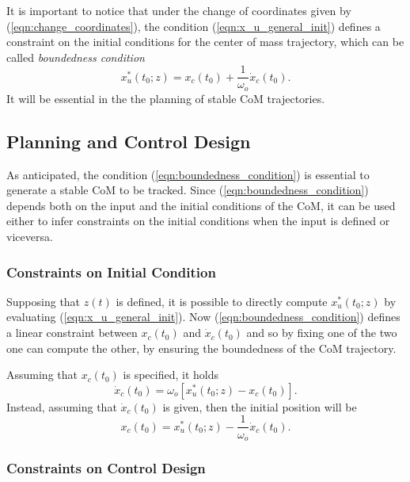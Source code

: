 \documentclass[11pt]{article}
\begin{document}
It is important to notice that under the change of coordinates given by (\ref{eqn:change_coordinates}), the condition (\ref{eqn:x_u_general_init}) defines a constraint on the initial conditions for the center of mass trajectory, which can be called \textit{boundedness condition}
\begin{equation}
\label{eqn:boundedness_condition}
x_u^*(t_0;z) = x_c(t_0) + \frac{1}{\omega_o}\dot{x}_c(t_0).
\end{equation}
It will be essential in the the planning of stable CoM trajectories.

\subsection{Planning and Control Design}

As anticipated, the condition (\ref{eqn:boundedness_condition}) is essential to generate a stable CoM to be tracked. Since (\ref{eqn:boundedness_condition}) depends both on the input and the initial conditions of the CoM, it can be used either to infer constraints on the initial conditions when the input is defined or viceversa.

\subsubsection{Constraints on Initial Condition}

Supposing that $z(t)$ is defined, it is possible to directly compute $x_u^*(t_0;z)$ by evaluating (\ref{eqn:x_u_general_init}). Now (\ref{eqn:boundedness_condition}) defines a linear constraint between $x_c(t_0)$ and $\dot{x}_c(t_0)$ and so by fixing one of the two one can compute the other, by ensuring the boundedness of the CoM trajectory.

Assuming that $x_c(t_0)$ is specified, it holds
\begin{equation}
\label{eqn:init_vel}
\dot{x}_c(t_0) = \omega_o[x_u^*(t_0;z)-x_c(t_0)].
\end{equation}
Instead, assuming that $\dot{x}_c(t_0)$ is given, then the initial position will be
\begin{equation}
\label{eqn:init_pos}
x_c(t_0) = x_u^*(t_0;z) - \frac{1}{\omega_o}\dot{x}_c(t_0).
\end{equation}

\subsubsection{Constraints on Control Design}
\end{document}
